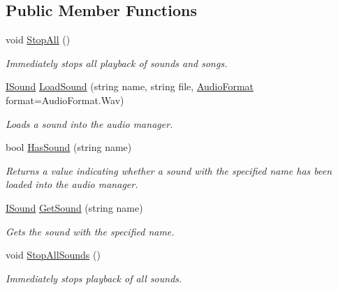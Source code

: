 \subsection*{Public Member Functions}
\begin{DoxyCompactItemize}
\item 
void \hyperlink{interface_tri_devs_1_1_tri_engine_1_1_audio_1_1_i_audio_manager_a2148566066e4700388c713f3c4c710af}{Stop\-All} ()
\begin{DoxyCompactList}\small\item\em Immediately stops all playback of sounds and songs. \end{DoxyCompactList}\item 
\hyperlink{interface_tri_devs_1_1_tri_engine_1_1_audio_1_1_i_sound}{I\-Sound} \hyperlink{interface_tri_devs_1_1_tri_engine_1_1_audio_1_1_i_audio_manager_a4f9892412bd2b05b20cdd60517181481}{Load\-Sound} (string name, string file, \hyperlink{namespace_tri_devs_1_1_tri_engine_1_1_audio_a3e1817498a8306afd084903a967537ef}{Audio\-Format} format=Audio\-Format.\-Wav)
\begin{DoxyCompactList}\small\item\em Loads a sound into the audio manager. \end{DoxyCompactList}\item 
bool \hyperlink{interface_tri_devs_1_1_tri_engine_1_1_audio_1_1_i_audio_manager_a5a0f5106c284ccb9c83cc04e36457a49}{Has\-Sound} (string name)
\begin{DoxyCompactList}\small\item\em Returns a value indicating whether a sound with the specified name has been loaded into the audio manager. \end{DoxyCompactList}\item 
\hyperlink{interface_tri_devs_1_1_tri_engine_1_1_audio_1_1_i_sound}{I\-Sound} \hyperlink{interface_tri_devs_1_1_tri_engine_1_1_audio_1_1_i_audio_manager_a9011155a1fcaae04660066afa72b82f6}{Get\-Sound} (string name)
\begin{DoxyCompactList}\small\item\em Gets the sound with the specified name. \end{DoxyCompactList}\item 
void \hyperlink{interface_tri_devs_1_1_tri_engine_1_1_audio_1_1_i_audio_manager_a77c15b0eab9638436d5f7773c6fad61a}{Stop\-All\-Sounds} ()
\begin{DoxyCompactList}\small\item\em Immediately stops playback of all sounds. \end{DoxyCompactList}\item 

\end{DoxyCompactItemize}
